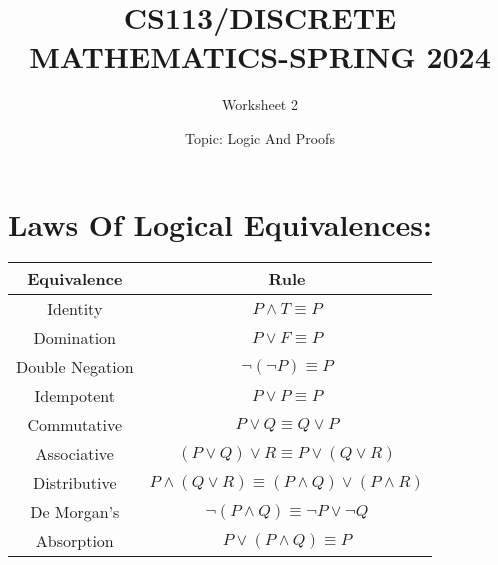 \documentclass{exam}
\title{CS113/DISCRETE MATHEMATICS-SPRING 2024}
\author{Worksheet 2}
\date{Topic: Logic And Proofs}
\begin{document}
\maketitle

\begin{center}
\end{center}

\vspace{5mm}

\vspace{5mm}

\section{Laws Of Logical Equivalences: }
\vspace{5mm}
\begin{center}
\begin{tabular}{|c|c|}
  \hline
  Equivalence & Rule \\
  \hline
  Identity & $P \land T \equiv P$ \\
  Domination & $P \lor F \equiv P$ \\
  Double Negation & $\lnot(\lnot P) \equiv P$ \\
  Idempotent & $P \lor P \equiv P$ \\
  Commutative & $P \lor Q \equiv Q \lor P$ \\
  Associative & $(P \lor Q) \lor R \equiv P \lor (Q \lor R)$ \\
  Distributive & $P \land (Q \lor R) \equiv (P \land Q) \lor (P \land R)$ \\
  De Morgan's & $\lnot(P \land Q) \equiv \lnot P \lor \lnot Q$ \\
  Absorption & $P \lor (P \land Q) \equiv P$ \\
  \hline
\end{tabular}
\end{center}
\vspace{5mm}
\end{document}
